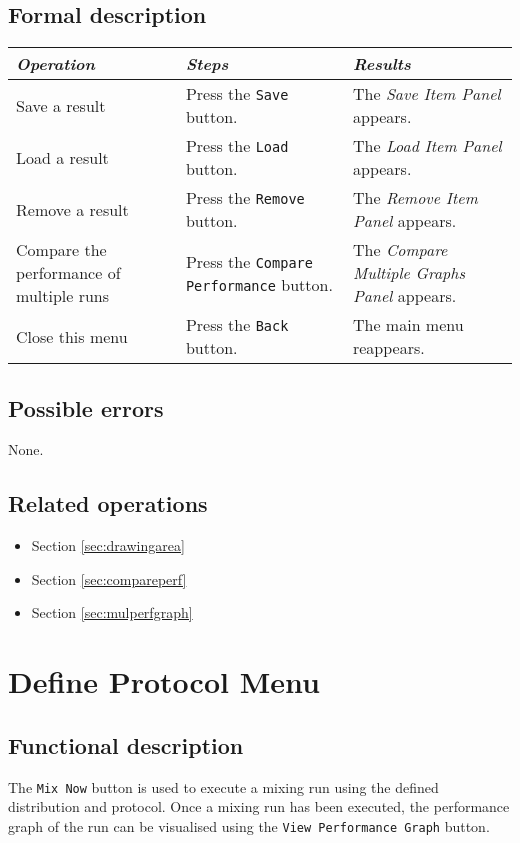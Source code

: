   \subsection*{Formal description}
  \begin{tabularx}{\textwidth}{XXX}
    \toprule
    \emph{Operation} & \emph{Steps} & \emph{Results} \\
    \midrule
    Save a result & Press the \texttt{Save} button. & The \emph{Save Item Panel} appears. \\
    \midrule
    Load a result & Press the \texttt{Load} button. & The \emph{Load Item Panel} appears. \\
    \midrule
    Remove a result & Press the \texttt{Remove} button. & The \emph{Remove Item Panel} appears. \\
    \midrule
    Compare the performance of multiple runs & Press the \texttt{Compare Performance} button. & The \emph{Compare Multiple Graphs Panel} appears. \\
    \midrule
    Close this menu & Press the \texttt{Back} button. & The main menu reappears.
    \bottomrule
  \end{tabularx}

  \subsection*{Possible errors}
  None.
  
  \subsection*{Related operations}
  \begin{itemize}
    \item Section \ref{sec:drawingarea}
    \item Section \ref{sec:compareperf}
    \item Section \ref{sec:mulperfgraph}
  \end{itemize}

\section{Define Protocol Menu}\label{sec:defprot}
  \subsection*{Functional description}
  The \texttt{Mix Now} button is used to execute a mixing run using the defined distribution and protocol. Once a mixing run has been executed, the performance graph of the run can be visualised using the \texttt{View Performance Graph} button.
  
